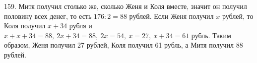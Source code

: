 159. Митя получил столько же, сколько Женя и Коля вместе, значит он получил половину всех денег, то есть $176:2=88$ рублей. Если Женя получил $x$ рублей, то Коля получил $x+34$ рубля и  $x+x+34=88,\ 2x+34=88,\ 2x=54,\ x=27,\ x+34=61$ рубль. Таким образом, Женя получил 27 рублей, Коля получил 61 рубль, а Митя получил 88 рублей.\\
